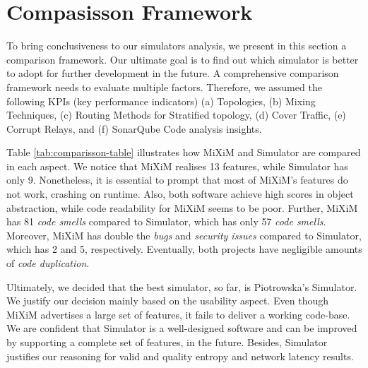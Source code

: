 \documentclass[logo,msc,cyber]{infthesis}   %
\begin{document}
\section{Compasisson Framework}

To bring conclusiveness to our simulators analysis, we present in this section a
comparison framework. Our ultimate goal is to find out which simulator is better
to adopt for further development in the future. A comprehensive comparison
framework needs to evaluate multiple factors. Therefore, we assumed the following
KPIs (key performance indicators) (a) Topologies, (b) Mixing Techniques, (c)
Routing Methods for Stratified topology, (d) Cover Traffic, (e) Corrupt Relays,
and (f) SonarQube Code analysis insights.

Table \ref{tab:comparisson-table} illustrates how MiXiM and Simulator are
compared in each aspect. We notice that MiXiM realises 13 features, while
Simulator has only 9. Nonetheless, it is essential to prompt that most of
MiXiM's features do not work, crashing on runtime. Also, both software achieve
high scores in object abstraction, while code readability for MiXiM seems to be
poor. Further, MiXiM has 81 \emph{code smells} compared to Simulator, which  has
only 57 \emph{code smells}. Moreover, MiXiM has double the \emph{bugs} and
\emph{security issues} compared to Simulator, which has 2 and 5, respectively.
Eventually, both projects have negligible amounts of \emph{code duplication}.

Ultimately, we decided that the best simulator, so far, is Piotrowska's
Simulator. We justify our decision mainly based on the usability aspect. Even
though MiXiM advertises a large set of features, it fails to deliver a working
code-base. We are confident that Simulator is a well-designed software and can
be improved by supporting a complete set of features, in the future. Besides,
Simulator justifies our reasoning for valid and quality entropy and network
latency results. 
\end{document}
